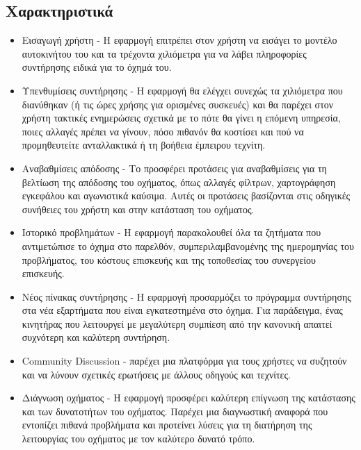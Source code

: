 \documentclass[11pt]{scrartcl} %
\begin{document}
\subsection{Χαρακτηριστικά}
\begin{itemize}
    \item Εισαγωγή χρήστη - Η εφαρμογή επιτρέπει στον χρήστη να εισάγει το μοντέλο αυτοκινήτου του και τα τρέχοντα χιλιόμετρα για να λάβει πληροφορίες συντήρησης ειδικά για το όχημά του.
    \item Υπενθυμίσεις συντήρησης - Η εφαρμογή θα ελέγχει συνεχώς τα χιλιόμετρα που διανύθηκαν (ή τις ώρες χρήσης για ορισμένες συσκευές) και θα παρέχει στον χρήστη τακτικές ενημερώσεις σχετικά με το πότε θα γίνει η επόμενη υπηρεσία, ποιες αλλαγές πρέπει να γίνουν, πόσο πιθανόν θα κοστίσει και πού να προμηθευτείτε ανταλλακτικά ή τη βοήθεια έμπειρου τεχνίτη.
    \item Αναβαθμίσεις απόδοσης - Το  προσφέρει προτάσεις για αναβαθμίσεις για τη βελτίωση της απόδοσης του οχήματος, όπως αλλαγές φίλτρων, χαρτογράφηση εγκεφάλου και αγωνιστικά καύσιμα. Αυτές οι προτάσεις βασίζονται στις οδηγικές συνήθειες του χρήστη και στην κατάσταση του οχήματος.
    \item Ιστορικό προβλημάτων - Η εφαρμογή παρακολουθεί όλα τα ζητήματα που αντιμετώπισε το όχημα στο παρελθόν, συμπεριλαμβανομένης της ημερομηνίας του προβλήματος, του κόστους επισκευής και της τοποθεσίας του συνεργείου επισκευής.
    \item Νέος πίνακας συντήρησης - Η εφαρμογή προσαρμόζει το πρόγραμμα συντήρησης στα νέα εξαρτήματα που είναι εγκατεστημένα στο όχημα. Για παράδειγμα, ένας κινητήρας που λειτουργεί με μεγαλύτερη συμπίεση από την κανονική απαιτεί συχνότερη και καλύτερη συντήρηση.
    \item Community Discussion -  παρέχει μια πλατφόρμα για τους χρήστες να συζητούν και να λύνουν σχετικές ερωτήσεις με άλλους οδηγούς και τεχνίτες.
    \item Διάγνωση οχήματος - Η εφαρμογή προσφέρει καλύτερη επίγνωση της κατάστασης και των δυνατοτήτων του οχήματος. Παρέχει μια διαγνωστική αναφορά που εντοπίζει πιθανά προβλήματα και προτείνει λύσεις για τη διατήρηση της λειτουργίας του οχήματος με τον καλύτερο δυνατό τρόπο.
\end{itemize}
\end{document}

